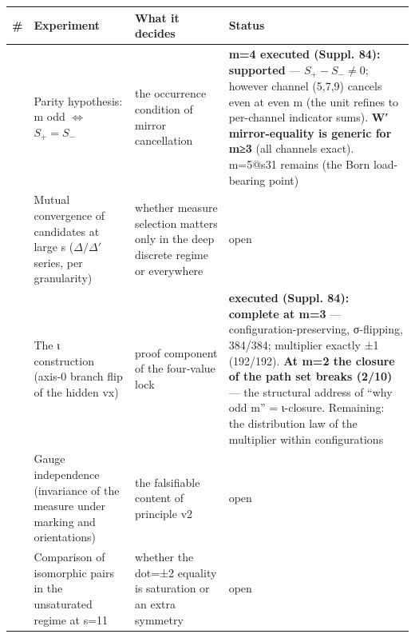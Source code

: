 \documentclass[
]{ltjsarticle}
\newcounter{none} %
\begin{document}
{\def\LTcaptype{none} %
\begin{longtable}[]{@{}
  >{\raggedright\arraybackslash}p{}
  >{\raggedright\arraybackslash}p{}
  >{\raggedright\arraybackslash}p{}
  >{\raggedright\arraybackslash}p{}@{}}
\toprule\noalign{}
\begin{minipage}[b]{\linewidth}\raggedright
\#
\end{minipage} & \begin{minipage}[b]{\linewidth}\raggedright
Experiment
\end{minipage} & \begin{minipage}[b]{\linewidth}\raggedright
What it decides
\end{minipage} & \begin{minipage}[b]{\linewidth}\raggedright
Status
\end{minipage} \\
\midrule\noalign{}
\endhead
\bottomrule\noalign{}
\endlastfoot
1 & Parity hypothesis: m odd \(\Longleftrightarrow\) \(S_+=S_-\) & the
occurrence condition of mirror cancellation & \textbf{m=4 executed
(Suppl. 84): supported} --- \(S_+-S_-\neq0\); however channel (5,7,9)
cancels even at even m (the unit refines to per-channel indicator sums).
\textbf{W′ mirror-equality is generic for m≥3} (all channels exact).
m=5@s31 remains (the Born load-bearing point) \\
2 & Mutual convergence of candidates at large s (\(\Delta/\Delta'\)
series, per granularity) & whether measure selection matters only in the
deep discrete regime or everywhere & open \\
3 & The ι construction (axis-0 branch flip of the hidden vx) & proof
component of the four-value lock & \textbf{executed (Suppl. 84):
complete at m=3} --- configuration-preserving, σ-flipping, 384/384;
multiplier exactly ±1 (192/192). \textbf{At m=2 the closure of the path
set breaks (2/10)} --- the structural address of ``why odd m'' =
ι-closure. Remaining: the distribution law of the multiplier within
configurations \\
4 & Gauge independence (invariance of the measure under marking and
orientations) & the falsifiable content of principle v2 & open \\
5 & Comparison of isomorphic pairs in the unsaturated regime at s=11 &
whether the dot=±2 equality is saturation or an extra symmetry & open \\
\end{longtable}
}
\end{document}
